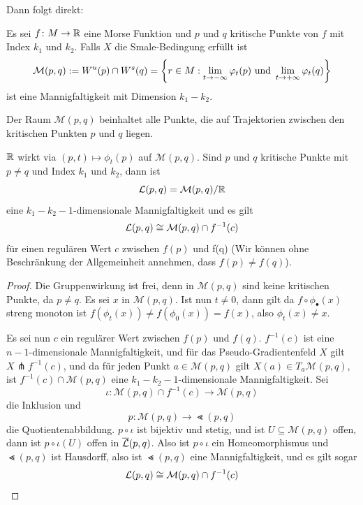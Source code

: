 Dann folgt direkt:

\begin{prop}
    Es sei $f \colon M \to { \mathbb R }$ eine Morse Funktion und $p$ und $q$ kritische Punkte von $f$ mit 
    Index $k_1$ und $k_2$. Falls $X$ die Smale-Bedingung erfüllt ist
    \[ \mathcal{M} (p, q) := { W^u } (p) \cap { W^s } (q) = 
        \left\{ r \in M : \lim_{t \to - \infty} \varphi_t(p) \text{ und } 
        \lim_{t \to + \infty} \varphi_t(q) \right\} \]
    ist eine Mannigfaltigkeit mit Dimension $k_1 - k_2$.
\end{prop}

Der Raum $\mathcal{M} (p, q)$ beinhaltet alle Punkte, die auf Trajektorien zwischen den kritischen
Punkten $p$ und $q$ liegen. 


\begin{prop}
    \label{prop: wohldefiniertheit von Lt}
    ${ \mathbb R }$ wirkt via $(p, t) \mapsto \phi_t(p)$ auf $\mathcal{M}(p, q)$. Sind $p$ und $q$ kritische 
    Punkte mit $p \neq q$ und Index $k_1$ und $k_2$, dann ist 
    \[ { \mathcal{L} } (p, q) = \mathcal{M} (p, q) / { \mathbb R } \]
    eine $k_1 - k_2 - 1$-dimensionale Mannigfaltigkeit und es gilt 
    \[ { \mathcal{L} } (p, q) \cong \mathcal{M} (p, q) \cap f^{-1}(c) \]
    für einen regulären Wert $c$ zwischen $f(p)$ und f(q)
    (Wir können ohne Beschränkung der Allgemeinheit annehmen, dass $f(p) \neq f(q)$).
\end{prop}

\begin{proof}
    Die Gruppenwirkung ist frei, denn in $\mathcal{M} (p, q)$
    sind keine kritischen Punkte, da $p \neq q$. Es sei $x$ in $\mathcal{M} (p, q)$. 
    Ist nun $t \neq 0$, dann gilt da $f \circ \phi_{\bullet}(x)$ streng monoton ist 
    $f(\phi_t(x)) \neq f(\phi_0(x)) = f(x)$, also $\phi_t(x) \neq x$.

    Es sei nun $c$ ein regulärer Wert zwischen $f(p)$ und $f(q)$. $f^{-1}(c)$ ist eine 
    $n - 1$-dimensionale Mannigfaltigkeit, und für das Pseudo-Gradientenfeld $X$ gilt 
    $X \pitchfork f^{-1}(c)$, und da für jeden Punkt $a \in \mathcal{M}(p, q)$ 
    gilt $X(a) \in T_a \mathcal{M} (p, q)$, ist $f^{-1}(c) \cap \mathcal{M} (p, q)$ 
    eine $k_1 - k_2 - 1$-dimensionale Mannigfaltigkeit. Sei 
    \[ \iota \colon \mathcal{M} (p, q) \cap f^{-1}(c) \to \mathcal{M}(p, q)\] 
    die Inklusion und 
    \[ p \colon \mathcal{M} (p, q) \to \Lt (p, q) \] 
    die Quotientenabbildung. $p \circ \iota$ ist bijektiv und stetig, und ist 
    $U \subseteq \mathcal{M} (p, q)$ offen, dann ist $p \circ \iota (U)$ offen in ${\overline{\mathcal{L}} } (p, q)$. 
    Also ist $p \circ \iota$ ein Homeomorphismus und $\Lt (p, q)$ ist Hausdorff, also ist $\Lt (p, q)$
    eine Mannigfaltigkeit, und es gilt sogar
    \[ { \mathcal{L} } (p, q) \cong \mathcal{M} (p, q) \cap f^{-1}(c) \]
\end{proof}

